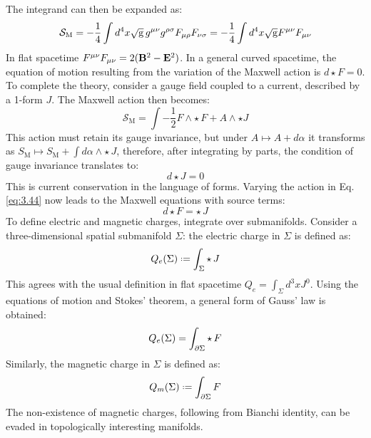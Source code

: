 The integrand can then be expanded as:
\begin{equation*}
  \mathcal{S}_{\text{M}} = - \frac{1}{4} \int d^4 x \sqrt{\mathrm{g}}\, g^{\mu \nu} g^{\rho \sigma} F_{\mu \rho} F_{\nu \sigma} = - \frac{1}{4} \int d^4 x \sqrt{\mathrm{g}} F^{\mu \nu} F_{\mu \nu}
\end{equation*}
In flat spacetime $ F^{\mu \nu} F_{\mu \nu} = 2 (\mathbf{B}^2 - \mathbf{E}^2) $. In a general curved spacetime, the equation of motion resulting from the variation of the Maxwell action is $ d \star F = 0 $.\\
To complete the theory, consider a gauge field coupled to a current, described by a 1-form $ J $. The Maxwell action then becomes:
\begin{equation}
  \mathcal{S}_{\text{M}} = \int - \frac{1}{2} F \wedge \star\, F + A \wedge \star J
  \label{eq:3.45}
\end{equation}
This action must retain its gauge invariance, but under $ A \mapsto A + d\alpha $ it transforms as $ S_{\text{M}} \mapsto S_{\text{M}} + \int d\alpha \wedge \star\, J $, therefore, after integrating by parts, the condition of gauge invariance translates to:
\begin{equation}
  d \star J = 0
  \label{eq:3.46}
\end{equation}
This is current conservation in the language of forms. Varying the action in Eq. \ref{eq:3.44} now leads to the Maxwell equations with source terms:
\begin{equation}
  d \star F = \star\, J
  \label{eq:3.47}
\end{equation}
To define electric and magnetic charges, integrate over submanifolds. Consider a three-dimensional spatial submanifold $ \Sigma $: the electric charge in $ \Sigma $ is defined as:
\begin{equation}
  Q_e(\Sigma) \defeq \int_{\Sigma} \star\, J
  \label{eq:3.48}
\end{equation}
This agrees with the usual definition in flat spacetime $ Q_e = \int_{\Sigma} d^3 x J^0 $. Using the equations of motion and Stokes' theorem, a general form of Gauss' law is obtained:
\begin{equation}
  Q_e(\Sigma) = \int_{\partial \Sigma} \star\, F
  \label{eq:3.49}
\end{equation}
Similarly, the magnetic charge in $ \Sigma $ is defined as:
\begin{equation}
  Q_m(\Sigma) \defeq \int_{\pa \Sigma} F
  \label{eq:3.50}
\end{equation}
The non-existence of magnetic charges, following from Bianchi identity, can be evaded in topologically interesting manifolds.\\
